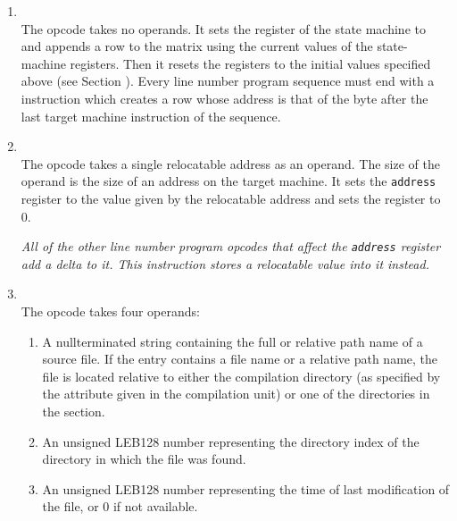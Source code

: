 \begin{enumerate}[1. ]

\item \textbf{\DWLNEendsequenceTARG} \\
The \DWLNEendsequenceTARG{} opcode takes no operands. It sets the
register of the state machine to  and
appends a row to the matrix using the current values of the
state-machine registers. Then it resets the registers to the
initial values specified above 
(see Section ). 
Every line
number program sequence must end with a \DWLNEendsequence{}
instruction which creates a row whose address is that of the
byte after the last target machine instruction of the sequence.

\item \textbf{\DWLNEsetaddressTARG} \\
The \DWLNEsetaddressTARG{} opcode takes a single relocatable
address as an operand. The size of the operand is the size
of an address on the target machine. It sets the \texttt{address}
register to the value given by the relocatable address and
sets the  register to 0.

\textit{All of the other line number program opcodes that
affect the \texttt{address} register add a delta to it. This instruction
stores a relocatable value into it instead.}

\item \textbf{\DWLNEdefinefileTARG} \\
The \DWLNEdefinefileTARG{} opcode takes four operands:
\begin{enumerate}[1. ]

\item A null\dash terminated string containing the full or relative
path name of a source file. If the entry contains a file
name or a relative path name, the file is located relative
to either the compilation directory (as specified by the
\DWATcompdir{} attribute given in the compilation unit)
or one of the directories in the 
 section.

\item An unsigned LEB128 
number representing the directory index
of the directory in which the file was found.  

\item An unsigned LEB128 
number representing the time of last modification
of the file, or 0 if not available.  


\end{enumerate}
\end{enumerate}
